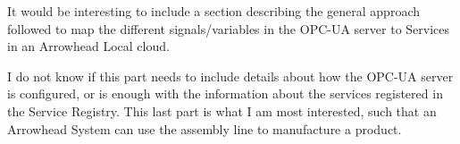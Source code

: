 It would be interesting to include a section describing the general approach followed to map the different signals/variables in the OPC-UA server to Services in an Arrowhead Local cloud.

I do not know if this part needs to include details about how the OPC-UA server is configured, or is enough with the information about the services registered in the Service Registry. This last part is what I am most interested, such that an Arrowhead System can use the assembly line to manufacture a product.